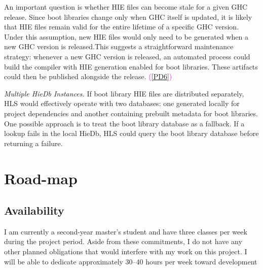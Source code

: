 \documentclass[a4paper,12pt]{article}
\begin{document}
An important question is whether HIE files can become stale for a given GHC release. Since boot libraries change only when GHC itself is updated, it is likely that HIE files remain valid for the entire lifetime of a specific GHC version. Under this assumption, new HIE files would only need to be generated when a new GHC version is released.This suggests a straightforward maintenance strategy: whenever a new GHC version is released, an automated process could build the compiler with HIE generation enabled for boot libraries. These artifacts could then be published alongside the release. \textcolor{magenta}{(\ref{PD6})}

\vspace{0.6em}
\textit{Multiple HieDb Instances.}
If boot library HIE files are distributed separately, HLS would effectively operate with two databases: one generated locally for project dependencies and another containing prebuilt metadata for boot libraries. One possible approach is to treat the boot library database as a fallback. If a lookup fails in the local HieDb, HLS could query the boot library database before returning a failure.
\section{Road-map}

\subsection{Availability}
I am currently a second-year master’s student and have three classes per week during the project period. Aside from these commitments, I do not have any other planned obligations that would interfere with my work on this project. I will be able to dedicate approximately 30–40 hours per week toward development
\end{document}
